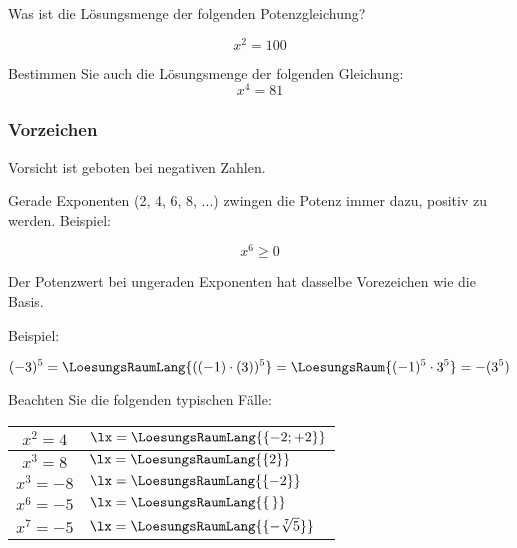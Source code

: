 Was ist die Lösungsmenge der folgenden Potenzgleichung?

$$x^2 = 100$$


Bestimmen Sie auch die Lösungsmenge der folgenden Gleichung:
$$x^4 = 81$$

\newpage
\subsubsection{Vorzeichen}
Vorsicht ist geboten bei negativen Zahlen.

\begin{gesetz}{}{}
  Gerade Exponenten (2, 4, 6,
8, ...) zwingen die Potenz immer dazu, positiv zu werden. Beispiel:

$$x^6 \ge 0$$

Der Potenzwert bei ungeraden Exponenten hat dasselbe Vorezeichen wie die
Basis.

Beispiel:

$$(-3)^5 = \LoesungsRaumLang{((-1)\cdot{}(3))^5} = \LoesungsRaum{(-1)^5 \cdot 3^5} = - (3^5)$$
\end{gesetz}


Beachten Sie die folgenden typischen Fälle:

 \renewcommand{\arraystretch}{2}

\begin{tabular}{|c|l|}
  \hline
  $x^2 = 4$ & $\lx=\LoesungsRaumLang{\{-2; +2\}}$ \\
  \hline
  $x^3 =  8$& $\lx=\LoesungsRaumLang{\{2\}}$ \\
  \hline
  $x^3 = -8$& $\lx=\LoesungsRaumLang{\{-2\}}$ \\
  \hline
  $x^6 = -5$& $\lx=\LoesungsRaumLang{\{\,\}}$ \\
  \hline
  $x^7 = -5$& $\lx=\LoesungsRaumLang{\{-\sqrt[7]{5}\}}$ \\
  \hline
  \end{tabular} 

 \renewcommand{\arraystretch}{1}

 \newpage
 
